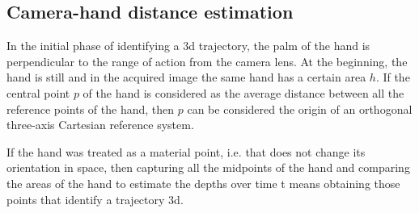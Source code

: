 \subsection{Camera-hand distance estimation}
\label{subsec:cam-hand}
%
%

In the initial phase of identifying a \gls{3d} trajectory, the palm of the hand is perpendicular to the range of action from the camera lens. At the beginning, the hand is still and in the acquired image the same hand has a certain area $h$. If the central point $p$ of the hand is considered as the average distance between all the reference points of the hand, then $p$ can be considered the origin of an orthogonal three-axis Cartesian reference system.

\noindent If the hand was treated as a material point, i.e. that does not change its orientation in space, then capturing all the midpoints of the hand and comparing the areas of the hand to estimate the depths over time t means obtaining those points that identify a trajectory \gls{3d}.

